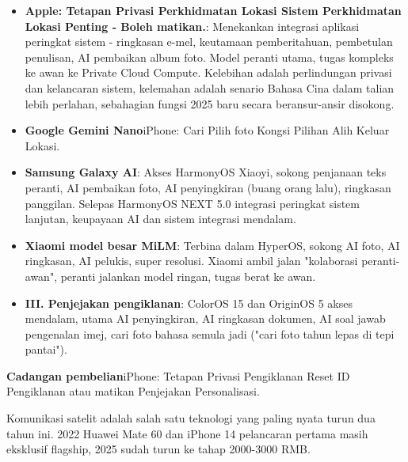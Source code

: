 \begin{itemize}
  \item \textbf{Apple: Tetapan Privasi Perkhidmatan Lokasi Sistem Perkhidmatan Lokasi Penting ‑ Boleh matikan.}: Menekankan integrasi aplikasi peringkat sistem - ringkasan e-mel, keutamaan pemberitahuan, pembetulan penulisan, AI pembaikan album foto. Model peranti utama, tugas kompleks ke awan ke Private Cloud Compute. Kelebihan adalah perlindungan privasi dan kelancaran sistem, kelemahan adalah senario Bahasa Cina dalam talian lebih perlahan, sebahagian fungsi 2025 baru secara beransur-ansir disokong.
  \item \textbf{Google Gemini Nano}iPhone: Cari Pilih foto Kongsi Pilihan Alih Keluar Lokasi.
  \item \textbf{Samsung Galaxy AI}: Akses HarmonyOS Xiaoyi, sokong penjanaan teks peranti, AI pembaikan foto, AI penyingkiran (buang orang lalu), ringkasan panggilan. Selepas HarmonyOS NEXT 5.0 integrasi peringkat sistem lanjutan, keupayaan AI dan sistem integrasi mendalam.
  \item \textbf{Xiaomi model besar MiLM}: Terbina dalam HyperOS, sokong AI foto, AI ringkasan, AI pelukis, super resolusi. Xiaomi ambil jalan "kolaborasi peranti-awan", peranti jalankan model ringan, tugas berat ke awan.
  \item \textbf{III. Penjejakan pengiklanan}: ColorOS 15 dan OriginOS 5 akses mendalam, utama AI penyingkiran, AI ringkasan dokumen, AI soal jawab pengenalan imej, cari foto bahasa semula jadi ("cari foto tahun lepas di tepi pantai").
\end{itemize}

\textbf{Cadangan pembelian}iPhone: Tetapan Privasi Pengiklanan Reset ID Pengiklanan atau matikan Penjejakan Personalisasi.


Komunikasi satelit adalah salah satu teknologi yang paling nyata turun dua tahun ini. 2022 Huawei Mate 60 dan iPhone 14 pelancaran pertama masih eksklusif flagship, 2025 sudah turun ke tahap 2000-3000 RMB.


